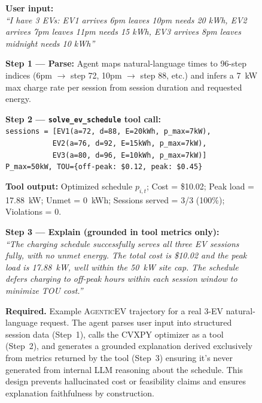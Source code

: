\documentclass{article}
\newcommand{\modelname}{\textsc{AgenticEV}}
\newcommand{\tool}[1]{\texttt{#1}}
\begin{document}
\begin{figure}[ht]
\centering
\small
\begin{minipage}{0.97\linewidth}
\noindent\textbf{User input:}\\
\textit{``I have 3 EVs: EV1 arrives 6pm leaves 10pm needs 20 kWh, EV2 arrives 7pm leaves 11pm needs 15 kWh, EV3 arrives 8pm leaves midnight needs 10 kWh''}
\vspace{0.4em}

\noindent\textbf{Step 1 --- Parse:} Agent maps natural-language times to 96-step indices (6pm $\to$ step 72, 10pm $\to$ step 88, etc.) and infers a 7~kW max charge rate per session from session duration and requested energy.
\vspace{0.3em}

\noindent\textbf{Step 2 --- \tool{solve\_ev\_schedule} tool call:}\\
\texttt{sessions = [EV1(a=72, d=88, E=20kWh, p\_max=7kW),}\\
\texttt{\ \ \ \ \ \ \ \ \ \ \ EV2(a=76, d=92, E=15kWh, p\_max=7kW),}\\
\texttt{\ \ \ \ \ \ \ \ \ \ \ EV3(a=80, d=96, E=10kWh, p\_max=7kW)]}\\
\texttt{P\_max=50kW,\ TOU=\{off-peak: \$0.12, peak: \$0.45\}}
\vspace{0.3em}

\noindent\textbf{Tool output:} Optimized schedule $p_{i,t}$; Cost = \$10.02; Peak load = 17.88~kW; Unmet = 0~kWh; Sessions served = 3/3 (100\%); Violations = 0.
\vspace{0.3em}

\noindent\textbf{Step 3 --- Explain (grounded in tool metrics only):}\\
\textit{``The charging schedule successfully serves all three EV sessions fully, with no unmet energy. The total cost is \$10.02 and the peak load is 17.88~kW, well within the 50~kW site cap. The schedule defers charging to off-peak hours within each session window to minimize TOU cost.''}
\end{minipage}
\caption{\textbf{Required.} Example \modelname{} trajectory for a real 3-EV natural-language request. The agent parses user input into structured session data (Step~1), calls the CVXPY optimizer as a tool (Step~2), and generates a grounded explanation derived exclusively from metrics returned by the tool (Step~3) ensuring it's never generated from internal LLM reasoning about the schedule. This design prevents hallucinated cost or feasibility claims and ensures explanation faithfulness by construction.}
\label{fig:trajectory}
\end{figure}
\end{document}
